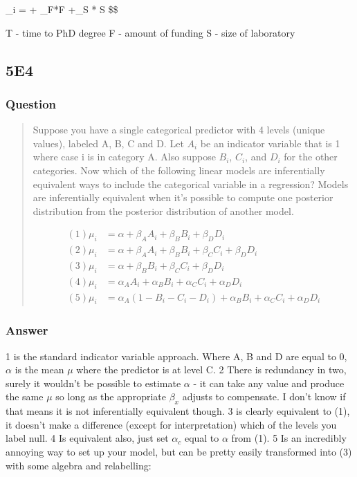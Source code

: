 \documentclass[
]{book}
\begin{document}
\mu\_i = \alpha + \beta\_F*F +\beta\_S * S
\$\$

T - time to PhD degree
F - amount of funding
S - size of laboratory

\hypertarget{e4-3}{%
\subsection*{5E4}\label{e4-3}}

\hypertarget{question-48}{%
\subsubsection*{Question}\label{question-48}}

\begin{quote}
Suppose you have a single categorical predictor with 4 levels (unique values), labeled A, B, C and D. Let \(A_i\) be an indicator variable that is 1 where case i is in category A. Also suppose \(B_i\), \(C_i\), and \(D_i\) for the other categories.
Now which of the following linear models are inferentially equivalent ways to include the categorical variable in a regression? Models are inferentially equivalent when it's possible to compute one posterior distribution from the posterior distribution of another model.

\[
\begin{aligned}
(1) \mu_i &= \alpha + \beta_A A_i + \beta_B B_i + \beta_D D_i  \\
(2) \mu_i &= \alpha + \beta_A A_i + \beta_B B_i + \beta_C C_i + \beta_D D_i \\ 
(3) \mu_i &= \alpha + \beta_B B_i + \beta_C C_i + \beta_D D_i \\
(4) \mu_i &= \alpha_A A_i + α_B B_i + α_C C_i + α_D D_i \\
(5) \mu_i &= \alpha_A(1 − B_i − C_i −D_i) + \alpha_B B_i + \alpha_C C_i + \alpha_D D_i
\end{aligned}
\]
\end{quote}

\hypertarget{answer-48}{%
\subsubsection*{Answer}\label{answer-48}}

1 is the standard indicator variable approach. Where A, B and D are equal to 0, \(\alpha\) is the mean \(\mu\) where the predictor is at level C.
2 There is redundancy in two, surely it wouldn't be possible to estimate \(\alpha\) - it can take any value and produce the same \(\mu\) so long as the appropriate \(\beta_x\) adjusts to compensate. I don't know if that means it is not inferentially equivalent though.
3 is clearly equivalent to (1), it doesn't make a difference (except for interpretation) which of the levels you label null.
4 Is equivalent also, just set \(\alpha_c\) equal to \(\alpha\) from (1).
5 Is an incredibly annoying way to set up your model, but can be pretty easily transformed into (3) with some algebra and relabelling:
\end{document}
